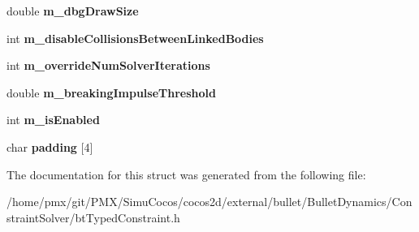 \begin{DoxyCompactItemize}
double {\bfseries m\+\_\+dbg\+Draw\+Size}
\item 
\mbox{\label{structbtTypedConstraintDoubleData_aa8de23349fe9d9a2c7e6da156c44626f}} 
int {\bfseries m\+\_\+disable\+Collisions\+Between\+Linked\+Bodies}
\item 
\mbox{\label{structbtTypedConstraintDoubleData_ad453be2297840b0dead1247b6c83925c}} 
int {\bfseries m\+\_\+override\+Num\+Solver\+Iterations}
\item 
\mbox{\label{structbtTypedConstraintDoubleData_abe82e2a1482fa494f8be799e468a7fa7}} 
double {\bfseries m\+\_\+breaking\+Impulse\+Threshold}
\item 
\mbox{\label{structbtTypedConstraintDoubleData_ac259b9b804341c00d87b2d2ff917a3ba}} 
int {\bfseries m\+\_\+is\+Enabled}
\item 
\mbox{\label{structbtTypedConstraintDoubleData_a352b85e4f369238e26770f73ae4b9a2b}} 
char {\bfseries padding} \mbox{[}4\mbox{]}
\end{DoxyCompactItemize}


The documentation for this struct was generated from the following file\+:\begin{DoxyCompactItemize}
\item 
/home/pmx/git/\+P\+M\+X/\+Simu\+Cocos/cocos2d/external/bullet/\+Bullet\+Dynamics/\+Constraint\+Solver/bt\+Typed\+Constraint.\+h\end{DoxyCompactItemize}
